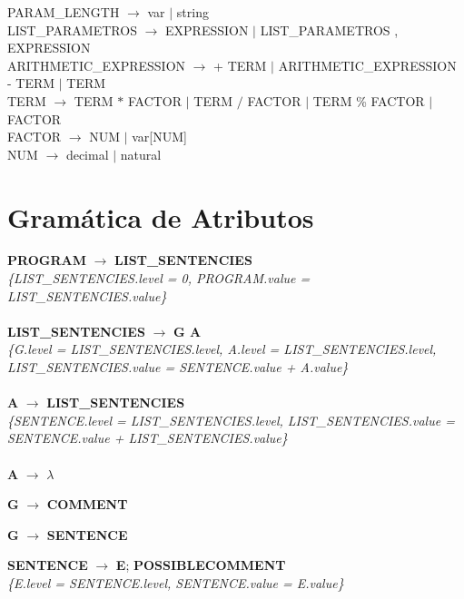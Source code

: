 \documentclass[10pt,a4paper]{article}
\begin{document}
PARAM\_LENGTH $\rightarrow$ var $|$ string \\

LIST\_PARAMETROS $\rightarrow$ EXPRESSION $|$ LIST\_PARAMETROS , EXPRESSION \\

ARITHMETIC\_EXPRESSION $\rightarrow$  + TERM $|$ ARITHMETIC\_EXPRESSION - TERM $|$ TERM \\

TERM $\rightarrow$ TERM $*$ FACTOR $|$ TERM $/$ FACTOR $|$ TERM \% FACTOR $|$ FACTOR \\

FACTOR $\rightarrow$ NUM $|$ var[NUM] \\

NUM $\rightarrow$ decimal $|$ natural


\section{Gramática de Atributos}

\textbf{PROGRAM} $\rightarrow$ \textbf{LIST\_SENTENCIES} \\

\textit{\{LIST\_SENTENCIES.level = 0, PROGRAM.value = LIST\_SENTENCIES.value\}} \\ \\


\textbf{LIST\_SENTENCIES} $\rightarrow$ \textbf{G A}\\

\textit{\{G.level = LIST\_SENTENCIES.level, A.level = LIST\_SENTENCIES.level, LIST\_SENTENCIES.value = SENTENCE.value + A.value\}}  \\ \\


\textbf{A} $\rightarrow$ \textbf{LIST\_SENTENCIES}\\

\textit{\{SENTENCE.level = LIST\_SENTENCIES.level, LIST\_SENTENCIES.value = SENTENCE.value + LIST\_SENTENCIES.value\}} \\  \\

\textbf{A} $\rightarrow$ $\lambda$ 

\textbf{G} $\rightarrow$ \textbf{COMMENT}

\textbf{G} $\rightarrow$ \textbf{SENTENCE}

\textbf{SENTENCE} $\rightarrow$ \textbf{E}; \textbf{POSSIBLECOMMENT}\\ 

\textit{\{E.level = SENTENCE.level, SENTENCE.value = E.value\}}  \\ \\
\end{document}
